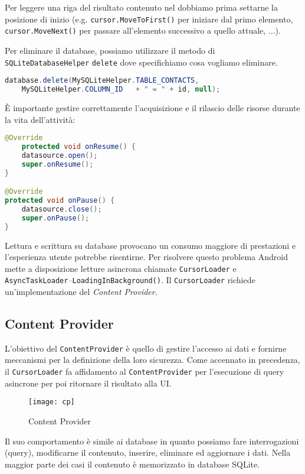Per leggere una riga del risultato contenuto nel \Cursor dobbiamo prima settarne
la posizione di inizio (e.g. \texttt{cursor.MoveToFirst()} per iniziare dal primo
elemento, \texttt{cursor.MoveNext()} per passare all'elemento successivo a quello
attuale, ...).

Per eliminare il database, possiamo utilizzare il metodo di \texttt{SQLiteDatabaseHelper}
\texttt{delete} dove specifichiamo cosa vogliamo eliminare.
\begin{lstlisting}[language=Java]
database.delete(MySQLiteHelper.TABLE_CONTACTS,
	MySQLiteHelper.COLUMN_ID   + " = " + id, null);
\end{lstlisting}

È importante gestire correttamente l'acquisizione e il rilascio delle risorse
durante la vita dell'attività:

\begin{lstlisting}[language=Java]
@Override
	protected void onResume() {
	datasource.open();
	super.onResume();
}

@Override
protected void onPause() {
	datasource.close();
	super.onPause();
}
\end{lstlisting}

Lettura e scrittura su database provocano un consumo maggiore di prestazioni e 
l'esperienza utente potrebbe risentirne. Per risolvere questo problema Android
mette a disposizione letture asincrona chiamate \texttt{CursorLoader} e
\texttt{AsyncTaskLoader}\textit{--}\texttt{LoadingInBackground()}. Il \texttt{CursorLoader} richiede un'implementazione del \textit{Content Provider}.

\subsection{Content Provider}

L'obiettivo del \texttt{ContentProvider} è quello di gestire l'accesso ai dati e
fornirne meccanismi per la definizione della loro sicurezza. Come accennato in
precedenza, il \texttt{CursorLoader} fa affidamento al \texttt{ContentProvider} per
l'esecuzione di query asincrone per poi ritornare il risultato alla UI.
\begin{figure}
    \centering
    \texttt{[image: cp]}
    \caption{Content Provider}
    \label{fig:my_label}
\end{figure}

Il suo comportamento è simile ai database in quanto possiamo fare interrogazioni
(query), modificarne il contenuto, inserire, eliminare ed aggiornare i dati.
Nella maggior parte dei casi il contenuto è memorizzato in database SQLite. 

